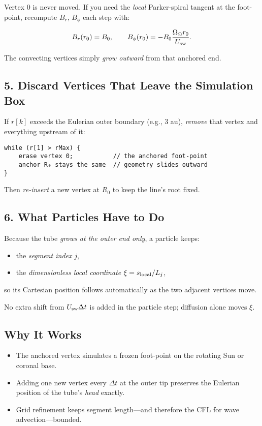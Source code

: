 Vertex 0 is never moved.
If you need the \emph{local} Parker-spiral tangent at the foot-point, recompute $B_r$, $B_\phi$ each step with:

\[
B_r(r_0) = B_0, \qquad  
B_\phi(r_0) = -B_0 \frac{\Omega_\odot r_0}{U_{\rm sw}}.
\]

The convecting vertices simply \emph{grow outward} from that anchored end.

\subsection*{5. Discard Vertices That Leave the Simulation Box}

If $r[k]$ exceeds the Eulerian outer boundary (e.g., 3 au),
\emph{remove} that vertex and everything upstream of it:

\begin{verbatim}
while (r[1] > rMax) {
    erase vertex 0;           // the anchored foot-point
    anchor R₀ stays the same  // geometry slides outward
}
\end{verbatim}

Then \emph{re-insert} a new vertex at $R_0$ to keep the line’s root fixed.

\subsection*{6. What Particles Have to Do}

Because the tube \emph{grows at the outer end only}, a particle keeps:

\begin{itemize}
\item the \emph{segment index} $j$,
\item the \emph{dimensionless local coordinate} $\xi = s_{\rm local}/L_j$,
\end{itemize}

so its Cartesian position follows automatically as the two adjacent vertices move.

No extra shift from $U_{\rm sw} \Delta t$ is added in the particle step; diffusion alone moves $\xi$.

\subsection*{Why It Works}

\begin{itemize}
\item The anchored vertex simulates a frozen foot-point on the rotating Sun or coronal base.
\item Adding one new vertex every $\Delta t$ at the outer tip preserves the Eulerian position of the tube’s \emph{head} exactly.
\item Grid refinement keeps segment length—and therefore the CFL for wave advection—bounded.
\end{itemize}

